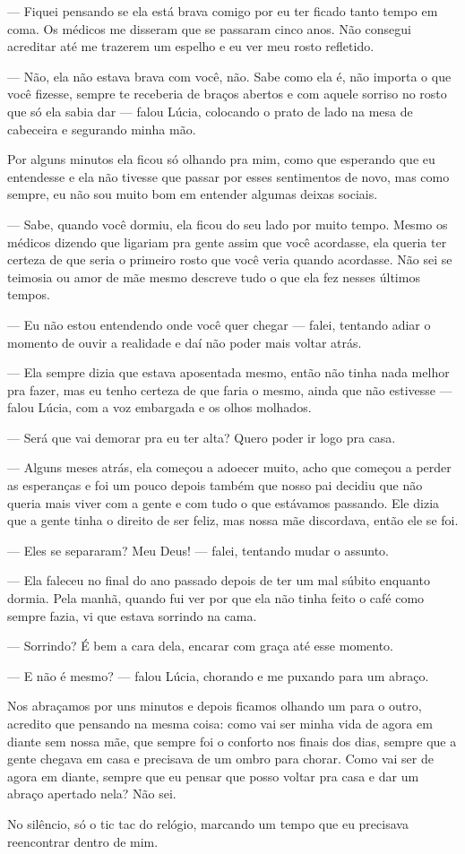 — Fiquei pensando se ela está brava comigo por eu ter ficado tanto tempo em coma. Os médicos me disseram que se passaram cinco anos. Não consegui acreditar até me trazerem um espelho e eu ver meu rosto refletido.

— Não, ela não estava brava com você, não. Sabe como ela é, não importa o que você fizesse, sempre te receberia de braços abertos e com aquele sorriso no rosto que só ela sabia dar — falou Lúcia, colocando o prato de lado na mesa de cabeceira e segurando minha mão.

Por alguns minutos ela ficou só olhando pra mim, como que esperando que eu entendesse e ela não tivesse que passar por esses sentimentos de novo, mas como sempre, eu não sou muito bom em entender algumas deixas sociais.

— Sabe, quando você dormiu, ela ficou do seu lado por muito tempo. Mesmo os médicos dizendo que ligariam pra gente assim que você acordasse, ela queria ter certeza de que seria o primeiro rosto que você veria quando acordasse. Não sei se teimosia ou amor de mãe mesmo descreve tudo o que ela fez nesses últimos tempos.

— Eu não estou entendendo onde você quer chegar — falei, tentando adiar o momento de ouvir a realidade e daí não poder mais voltar atrás.

— Ela sempre dizia que estava aposentada mesmo, então não tinha nada melhor pra fazer, mas eu tenho certeza de que faria o mesmo, ainda que não estivesse — falou Lúcia, com a voz embargada e os olhos molhados.

— Será que vai demorar pra eu ter alta? Quero poder ir logo pra casa.

— Alguns meses atrás, ela começou a adoecer muito, acho que começou a perder as esperanças e foi um pouco depois também que nosso pai decidiu que não queria mais viver com a gente e com tudo o que estávamos passando. Ele dizia que a gente tinha o direito de ser feliz, mas nossa mãe discordava, então ele se foi.

— Eles se separaram? Meu Deus! — falei, tentando mudar o assunto.

— Ela faleceu no final do ano passado depois de ter um mal súbito enquanto dormia. Pela manhã, quando fui ver por que ela não tinha feito o café como sempre fazia, vi que estava sorrindo na cama.

— Sorrindo? É bem a cara dela, encarar com graça até esse momento.

— E não é mesmo? — falou Lúcia, chorando e me puxando para um abraço.

Nos abraçamos por uns minutos e depois ficamos olhando um para o outro, acredito que pensando na mesma coisa: como vai ser minha vida de agora em diante sem nossa mãe, que sempre foi o conforto nos finais dos dias, sempre que a gente chegava em casa e precisava de um ombro para chorar. Como vai ser de agora em diante, sempre que eu pensar que posso voltar pra casa e dar um abraço apertado nela? Não sei.

No silêncio, só o tic tac do relógio, marcando um tempo que eu precisava reencontrar dentro de mim.
